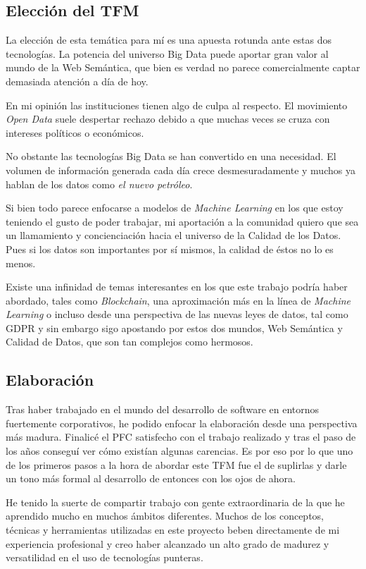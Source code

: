 \subsection{Elección del \acs{TFM}}

La elección de esta temática para mí es una apuesta rotunda ante estas dos
tecnologías. La potencia del universo Big Data puede aportar gran valor al mundo
de la Web Semántica, que bien es verdad no parece comercialmente captar
demasiada atención a día de hoy.

En mi opinión las instituciones tienen algo de culpa al respecto. El movimiento
\textit{Open Data} suele despertar rechazo debido a que muchas veces se cruza
con intereses políticos o económicos. 

No obstante las tecnologías Big Data se han convertido en una necesidad. El
volumen de información generada cada día crece desmesuradamente y muchos ya
hablan de los datos como \textit{el nuevo petróleo}. 

Si bien todo parece enfocarse a modelos de \textit{Machine Learning} en los que
estoy teniendo el gusto de poder trabajar, mi aportación a la comunidad quiero
que sea un llamamiento y concienciación hacia el universo de la Calidad de los
Datos. Pues si los datos son importantes por sí mismos, la calidad de éstos no
lo es menos. 

Existe una infinidad de temas interesantes en los que este trabajo podría haber
abordado, tales como \textit{Blockchain}, una aproximación más en la línea de
\textit{Machine Learning} o incluso desde una perspectiva de las nuevas leyes de
datos, tal como \acf{GDPR} y sin embargo sigo apostando por estos dos mundos,
Web Semántica y Calidad de Datos, que son tan complejos como hermosos. 

\subsection{Elaboración}

Tras haber trabajado en el mundo del desarrollo de software en entornos
fuertemente corporativos, he podido enfocar la elaboración desde una perspectiva
más madura. Finalicé el \acs{PFC} satisfecho con el trabajo realizado y tras el
paso de los años conseguí ver cómo existían algunas carencias. Es por eso por lo
que uno de los primeros pasos a la hora de abordar este \acs{TFM} fue el de
suplirlas y darle un tono más formal al desarrollo de entonces con los ojos de
ahora. 

He tenido la suerte de compartir trabajo con gente extraordinaria de la que he
aprendido mucho en muchos ámbitos diferentes. Muchos de los conceptos, técnicas y
herramientas utilizadas en este proyecto beben directamente de mi experiencia
profesional y creo haber alcanzado un alto grado de madurez y versatilidad en el
uso de tecnologías punteras. 

